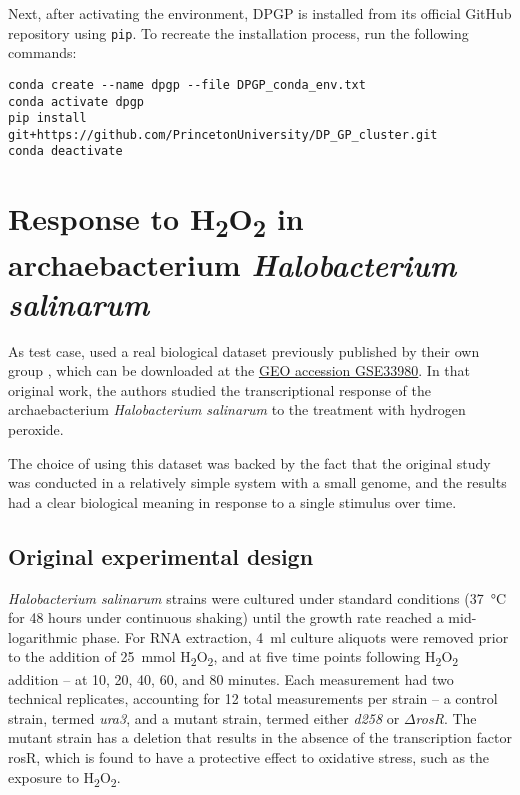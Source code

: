 Next, after activating the environment, DPGP is installed from its official GitHub repository using \texttt{pip}. To recreate the installation process, run the following commands:
\begin{verbatim}
conda create --name dpgp --file DPGP_conda_env.txt
conda activate dpgp
pip install git+https://github.com/PrincetonUniversity/DP_GP_cluster.git
conda deactivate
\end{verbatim}

\section{Response to \texorpdfstring{H\textsubscript{2}O\textsubscript{2}}{H2O2} in archaebacterium \textit{Halobacterium salinarum}}
As test case, \citeauthor{mcdowellClusteringGeneExpression2018} used a real biological dataset previously published by their own group \citep{sharmaRosRTranscriptionFactor2012}, which can be downloaded at the \href{https://www.ncbi.nlm.nih.gov/geo/query/acc.cgi?acc=GSE33980}{GEO accession GSE33980}. In that original work, the authors studied the transcriptional response of the archaebacterium \textit{Halobacterium salinarum} to the treatment with hydrogen peroxide. 

The choice of using this dataset was backed by the fact that the original study was conducted in a relatively simple system with a small genome, and the results had a clear biological meaning in response to a single stimulus over time. 

\subsection{Original experimental design}\label{biodata}
\textit{Halobacterium salinarum} strains were cultured under standard conditions (\SI{37}{\degreeCelsius} for 48 hours under continuous shaking) until the growth rate reached a mid-logarithmic phase. For RNA extraction, \SI{4}{\milli\litre} culture aliquots were removed prior to the addition of \SI{25}{\milli\mole} H\textsubscript{2}O\textsubscript{2}, and at five time points following H\textsubscript{2}O\textsubscript{2} addition -- at 10, 20, 40, 60, and 80 minutes. Each measurement had two technical replicates, accounting for 12 total measurements per strain -- a control strain, termed \emph{ura3}, and a mutant strain, termed either \emph{d258} or \emph{$\Delta$rosR}. The mutant strain has a deletion that results in the absence of the transcription factor rosR, which is found to have a protective effect to oxidative stress, such as the exposure to H\textsubscript{2}O\textsubscript{2}.

